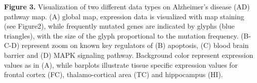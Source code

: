 \documentclass[a4,center,fleqn]{NAR}
\begin{document}
\textbf{Figure 3.} Visualization of two different data types on Alzheimer's
disease (AD) pathway map.  (A) global map, expression data is visualized with
map staining (see Figure2), while frequently mutated genes are indicated by
glyphs (blue triangles), with the size of the glyph proportional to the
mutation frequency. (B-C-D) represent zoom on known key regulators of (B)
apoptosis, (C) blood brain barrier and (D) MAPK signaling pathway. Background
color represent expression values as in (A), while barplots illustrate tissue
specific expression values for frontal cortex (FC), thalamo-cortical area (TC)
and hippocampus (HI).


\end{document}
